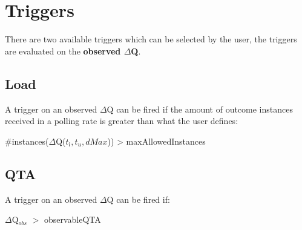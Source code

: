 \section{Triggers}
    There are two available triggers which can be selected by the user, the triggers are evaluated on the \textbf{observed $\Delta$Q}.
    \subsection{Load}
        A trigger on an observed $\Delta$Q can be fired if the amount of outcome instances received in a polling rate is greater than what the user defines:
    \begin{center}
        \#instances($\Delta$Q($t_l, t_u, dMax$)) > maxAllowedInstances 
    \end{center}

    \subsection{QTA}
        A trigger on an observed $\Delta$Q can be fired if:
        \begin{center}
            $\Delta$Q$_{obs}$ $>$ observableQTA
        \end{center}
